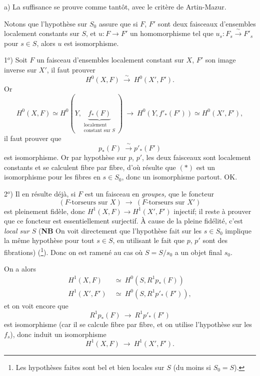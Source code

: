 \documentclass[11pt]{article}
\newcommand{\printedpage}[1]{\marginpar{\footnotesize p.~#1}}
\newcommand{\msp}[1]{\marginpar{\footnotesize [#1]}}
\begin{document}
a) La suffisance se prouve comme tantôt, avec le critère de Artin-Mazur.

\msp{page 132}

Notons que l'hypothèse sur $S_0$ assure que si $F$, $F'$ sont deux faisceaux d'ensembles localement constants sur $S$, et $u : F \longrightarrow F'$ un homomorphisme tel que $u_s : F_s \xrightarrow{\ \sim\ } F'_s$ pour $s \in S$, alors $u$ est isomorphisme. %

1$^{o}$) Soit $F$ un faisceau d'ensembles localement constant sur $X$, $F'$ son image inverse sur $X'$, il faut prouver
\[
H^0(X,F) \ \xrightarrow{\ \sim\ }\ H^0(X',F').
\]
Or
\[
H^0(X,F) \simeq H^0(Y, \underbrace{f_*(F)}_{\substack{\text{localement}\\ \text{constant sur } S}}) \ \longrightarrow\ H^0(Y, f'_*(F')) \simeq H^0(X',F'),
\] %
il faut prouver que
\[
p_*(F) \ \xrightarrow{\ \sim\ } p'_*(F') \tag*{$(*)$}
\]
est isomorphisme. Or par hypothèse sur $p$, $p'$, les deux faisceaux sont localement constants et se calculent fibre par fibre, d'où résulte que $(*)$ est un isomorphisme pour les fibres en $s \in S_0$, donc un isomorphisme partout. OK.

2$^{o}$) Il en résulte déjà, si $F$ est un faisceau en \textit{groupes,} que le foncteur
\[
(F\text{-torseurs sur } X) \ \longrightarrow\ (F\text{-torseurs sur } X')
\]
est pleinement fidèle, donc $H^1(X,F) \longrightarrow H^1(X',F')$ injectif; il reste à prouver que ce foncteur est essentiellement surjectif. À cause de la pleine fidélité, c'est \textit{local sur $S$} (\textbf{NB} On voit directement que l'hypothèse fait sur les $s \in S_0$ implique la même hypothèse pour tout $s \in S$, en utilisant le fait que $p$, $p'$ sont des fibrations) (\footnote{Les hypothèses faites sont bel et bien locales sur $S$ (du moins si $S_0 = S$).}). Donc on est ramené au cas où $S = S/s_0$ a un objet final $s_0$.

\printedpage{5}

\msp{page 133}

On a alors
\[
\begin{aligned}
H^1(X,F) &\ \simeq\ H^0(S, R^1p_*(F)) \\
H^1(X',F') &\ \simeq\ H^0(S, R^1p'_*(F')),
\end{aligned}
\]
et on voit encore que
\[
R^1p_*(F) \ \longrightarrow\ R^1p'_*(F')
\]
est isomorphisme (car il se calcule fibre par fibre, et on utilise l'hypothèse sur les $f_s$), donc induit un isomorphisme
\[
H^1(X,F) \ \longrightarrow\ H^1(X',F').
\]
\end{document}
